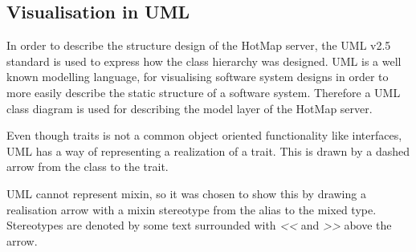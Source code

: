 \subsection{Visualisation in UML}
In order to describe the structure design of the HotMap server, the UML v2.5 standard is used to express how the class hierarchy was designed. UML is a well known modelling language, for visualising software system designs in order to more easily describe the static structure of a software system. Therefore a UML class diagram is used for describing the model layer of the HotMap server.

Even though traits is not a common object oriented functionality like interfaces, UML has a way of representing a realization of a trait. This is drawn by a dashed arrow from the class to the trait.

UML cannot represent mixin, so it was chosen to show this by drawing a realisation arrow with a mixin stereotype from the alias to the mixed type. Stereotypes are denoted by some text surrounded with \emph{<<} and \emph{>>} above the arrow.


